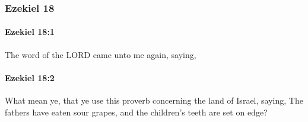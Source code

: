 	\subsubsection{Ezekiel 18} %
		\label{EZEKIEL-18}

		\paragraph{Ezekiel 18:1} %
			\label{EZEKIEL-18-1}

			The word of the LORD came unto me again, saying,


		\paragraph{Ezekiel 18:2} %
			\label{EZEKIEL-18-2}

			What mean ye, that ye use this proverb concerning the land of Israel, saying, The fathers have eaten sour grapes, and the children’s teeth are set on edge?

